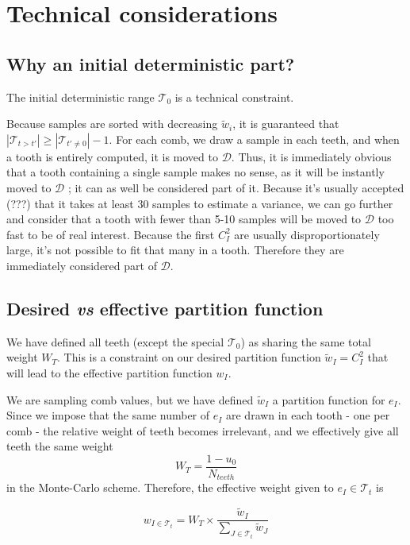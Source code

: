 \documentclass[./thesis.tex]{subfiles}
\begin{document}
\section{Technical considerations}


\subsection{Why an initial deterministic part?}

The initial deterministic range $\mathcal{T}_0$ is a technical constraint.

Because samples are sorted with decreasing $\tilde w_i$, it is guaranteed that $|\mathcal{T}_{t>t'}| \geq |\mathcal{T}_{t' \neq 0}|-1$.
For each comb, we draw a sample in each teeth, and when a tooth is entirely computed, it is moved to $\mathcal{D}$. Thus, it is immediately obvious that a tooth containing a single sample makes no sense, as it will be instantly moved to $\mathcal{D}$ ; it can as well be considered part of it. Because it's usually accepted (???) that it takes at least 30 samples to estimate a variance, we can go further and consider that a tooth with fewer than 5-10 samples will be moved to $\mathcal{D}$ too fast to be of real interest. Because the first $C_I^2$ are usually disproportionately large, it's not possible to fit that many in a tooth. Therefore they are immediately considered part of $\mathcal{D}$.

\subsection{Desired \textit{vs} effective partition function}

We have defined all teeth (except the special $\mathcal{T}_0$) as sharing the same total weight $W_T$. This is a constraint on our desired partition function $\tilde w_I = C_I^2$ that will lead to the effective partition function $w_I$.

We are sampling comb values, but we have defined $\tilde w_I$ a partition function for $e_I$. Since we impose that the same number of $e_I$ are drawn in each tooth - one per comb - the relative weight of teeth becomes irrelevant, and we effectively give all teeth the same weight 
\begin{equation}
W_T=\frac{1-u_0}{N_{teeth}}
\end{equation}
in the Monte-Carlo scheme. Therefore, the effective weight given to $e_I \in \mathcal{T}_t$ is

\begin{equation}
w_{I \in \mathcal{T}_t} = W_T \times \frac{\tilde w_I}{\sum_{J \in \mathcal{T}_t} \tilde w_J}
\end{equation}
\end{document}
